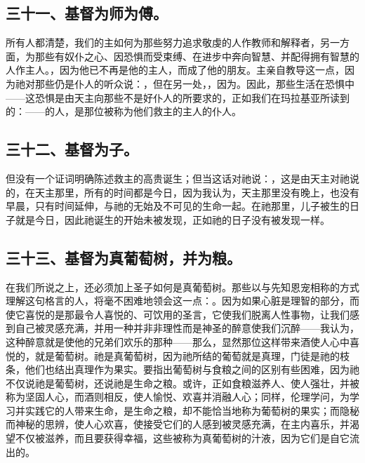 
\subsection{三十一、基督为师为傅。}

所有人都清楚，我们的主如何为那些努力追求敬虔的人作教师和解释者，另一方面，为那些有奴仆之心、因恐惧而受束缚、在进步中奔向智慧、并配得拥有智慧的人作主人。，因为他已不再是他的主人，而成了他的朋友。主亲自教导这一点，因为祂对那些仍是仆人的听众说：，但在另一处，，因为。因此，那些生活在恐惧中——这恐惧是由天主向那些不是好仆人的所要求的，正如我们在玛拉基亚所读到的：——的人，是那位被称为他们救主的主人的仆人。\par


\subsection{三十二、基督为子。}

但没有一个证词明确陈述救主的高贵诞生；但当这话对祂说：，这是由天主对祂说的，在天主那里，所有的时间都是今日，因为我认为，天主那里没有晚上，也没有早晨，只有时间延伸，与祂的无始及不可见的生命一起。在祂那里，儿子被生的日子就是今日，因此祂诞生的开始未被发现，正如祂的日子没有被发现一样。\par


\subsection{三十三、基督为真葡萄树，并为粮。}

在我们所说之上，还必须加上圣子如何是真葡萄树。那些以与先知恩宠相称的方式理解这句格言的人，将毫不困难地领会这一点：。因为如果心脏是理智的部分，而使它喜悦的是那最令人喜悦的、可饮用的圣言，它使我们脱离人性事物，让我们感到自己被灵感充满，并用一种并非非理性而是神圣的醉意使我们沉醉——我认为，这种醉意就是使他的兄弟们欢乐的那种——那么，显然那位这样带来酒使人心中喜悦的，就是葡萄树。祂是真葡萄树，因为祂所结的葡萄就是真理，门徒是祂的枝条，他们也结出真理作为果实。要指出葡萄树与食粮之间的区别有些困难，因为祂不仅说祂是葡萄树，还说祂是生命之粮。或许，正如食粮滋养人、使人强壮，并被称为坚固人心，而酒则相反，使人愉悦、欢喜并消融人心；同样，伦理学问，为学习并实践它的人带来生命，是生命之粮，却不能恰当地称为葡萄树的果实；而隐秘而神秘的思辨，使人心欢喜，使接受它们的人感到被灵感充满，在主内喜乐，并渴望不仅被滋养，而且要获得幸福，这些被称为真葡萄树的汁液，因为它们是自它流出的。\par

